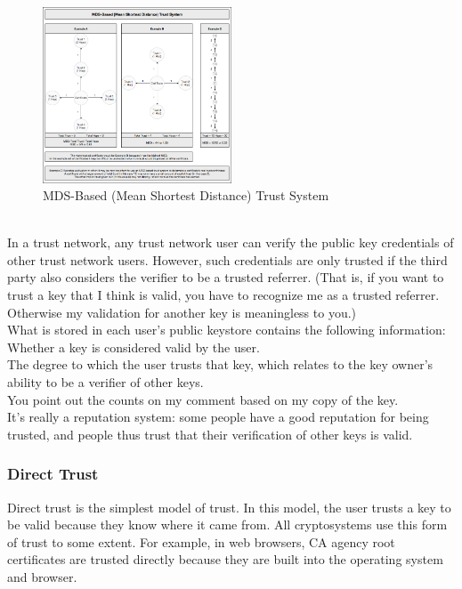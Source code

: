 \begin{figure}[H] %
    \centering %
    \includegraphics[width=0.5\textwidth]{figures/trustSystem.png} %
    \caption{MDS-Based (Mean Shortest Distance) Trust System} %
    \label{Fig.2: MDS-Based (Mean Shortest Distance) Trust System} %
    \end{figure}

\\
In a trust network, any trust network user can verify the public key credentials of other 
trust network users. However, such credentials are only trusted if the third party also 
considers the verifier to be a trusted referrer. (That is, if you want to trust a key that 
I think is valid, you have to recognize me as a trusted referrer. Otherwise my validation 
for another key is meaningless to you.)
\\
What is stored in each user's public keystore contains the following information:
\\
Whether a key is considered valid by the user.
\\
The degree to which the user trusts that key, which relates to the key owner's 
ability to be a verifier of other keys.
\\
You point out the counts on my comment based on my copy of the key.
\\
It's really a reputation system: some people have a good reputation for being 
trusted, and people thus trust that their verification of other keys is valid.

\subsubsection{Direct Trust}
Direct trust is the simplest model of trust. In this model, the user trusts a 
key to be valid because they know where it came from\cite{b27}. All cryptosystems use this 
form of trust to some extent. For example, in web browsers, CA agency root 
certificates are trusted directly because they are built into the operating system 
and browser\cite{b28}.

